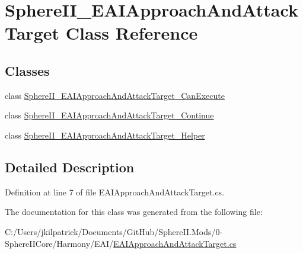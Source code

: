 \hypertarget{class_sphere_i_i___e_a_i_approach_and_attack_target}{}\section{Sphere\+I\+I\+\_\+\+E\+A\+I\+Approach\+And\+Attack\+Target Class Reference}
\label{class_sphere_i_i___e_a_i_approach_and_attack_target}
\subsection*{Classes}
\begin{DoxyCompactItemize}
\item 
class \mbox{\hyperlink{class_sphere_i_i___e_a_i_approach_and_attack_target_1_1_sphere_i_i___e_a_i_approach_and_attack_target___can_execute}{Sphere\+I\+I\+\_\+\+E\+A\+I\+Approach\+And\+Attack\+Target\+\_\+\+Can\+Execute}}
\item 
class \mbox{\hyperlink{class_sphere_i_i___e_a_i_approach_and_attack_target_1_1_sphere_i_i___e_a_i_approach_and_attack_target___continue}{Sphere\+I\+I\+\_\+\+E\+A\+I\+Approach\+And\+Attack\+Target\+\_\+\+Continue}}
\item 
class \mbox{\hyperlink{class_sphere_i_i___e_a_i_approach_and_attack_target_1_1_sphere_i_i___e_a_i_approach_and_attack_target___helper}{Sphere\+I\+I\+\_\+\+E\+A\+I\+Approach\+And\+Attack\+Target\+\_\+\+Helper}}
\end{DoxyCompactItemize}


\subsection{Detailed Description}


Definition at line 7 of file E\+A\+I\+Approach\+And\+Attack\+Target.\+cs.



The documentation for this class was generated from the following file\+:\begin{DoxyCompactItemize}
\item 
C\+:/\+Users/jkilpatrick/\+Documents/\+Git\+Hub/\+Sphere\+I\+I.\+Mods/0-\/\+Sphere\+I\+I\+Core/\+Harmony/\+E\+A\+I/\mbox{\hyperlink{_e_a_i_approach_and_attack_target_8cs}{E\+A\+I\+Approach\+And\+Attack\+Target.\+cs}}\end{DoxyCompactItemize}

